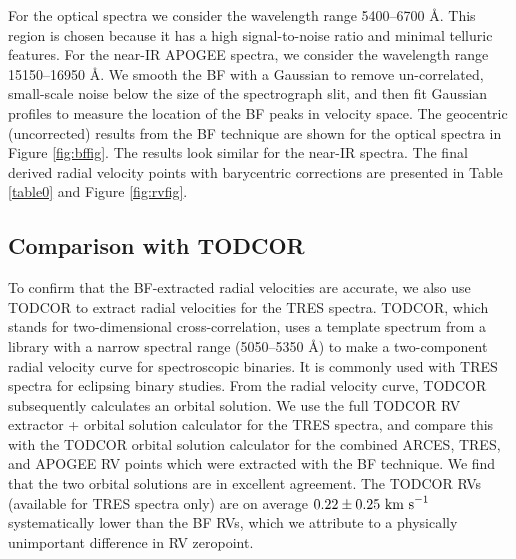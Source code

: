 For the optical spectra we consider the wavelength range 5400--6700 \AA. This region is chosen because it has a high signal-to-noise ratio and minimal telluric features. For the near-IR APOGEE spectra, we consider the wavelength range 15150--16950 \AA. We smooth the BF with a Gaussian to remove un-correlated, small-scale noise below the size of the spectrograph slit, and then fit Gaussian profiles to measure the location of the BF peaks in velocity space. The geocentric (uncorrected) results from the BF technique are shown for the optical spectra in Figure \ref{fig:bffig}. The results look similar for the near-IR spectra. The final derived radial velocity points with barycentric corrections are presented in Table \ref{table0} and Figure \ref{fig:rvfig}.

\subsection{Comparison with TODCOR}\label{todcor}
To confirm that the BF-extracted radial velocities are accurate, we also use TODCOR \citep{zuc94} to extract radial velocities for the TRES spectra. TODCOR, which stands for two-dimensional cross-correlation, uses a template spectrum from a library with a narrow spectral range (5050--5350 \AA) to make a two-component radial velocity curve for spectroscopic binaries. It is commonly used with TRES spectra for eclipsing binary studies. From the radial velocity curve, TODCOR subsequently calculates an orbital solution. We use the full TODCOR RV extractor + orbital solution calculator for the TRES spectra, and compare this with the TODCOR orbital solution calculator for the combined ARCES, TRES, and APOGEE RV points which were extracted with the BF technique. We find that the two orbital solutions are in excellent agreement. The TODCOR RVs (available for TRES spectra only) are on average $0.22 \pm 0.25 \ \rm{km \ s}^{-1}$ systematically lower than the BF RVs, which we attribute to a physically unimportant difference in RV zeropoint.
 
  
  
  
  